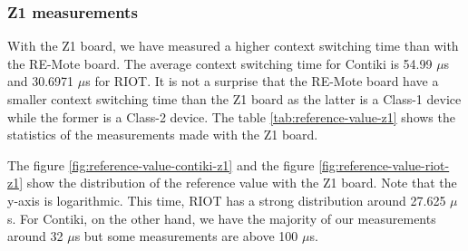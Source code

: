 \subsubsection{Z1 measurements}
With the Z1 board, we have measured a higher context switching time than with the RE-Mote board. The average context switching time for Contiki is 54.99 $\mu$s and 30.6971 $\mu$s for RIOT.
It is not a surprise that the RE-Mote board have a smaller context switching time than the Z1 board as the latter is a Class-1 device while the former is a Class-2 device.
The table \ref{tab:reference-value-z1} shows the statistics of the measurements made with the Z1 board.



The figure \ref{fig:reference-value-contiki-z1} and the figure \ref{fig:reference-value-riot-z1} show the distribution of the reference value with the Z1 board.
Note that the y-axis is logarithmic.
This time, RIOT has a strong distribution around 27.625 $\mu$s.
For Contiki, on the other hand, we have the majority of our measurements around 32 $\mu$s but some measurements are above 100 $\mu$s.

